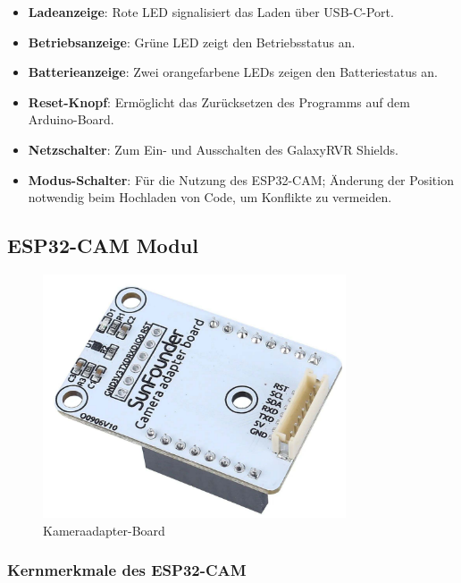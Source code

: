 \documentclass{vorlage-design-main}
\begin{document}
\begin{itemize}
  \begin{itemize}
  
  \item
    \textbf{Ladeanzeige}: Rote LED signalisiert das Laden über
    USB-C-Port.
  \item
    \textbf{Betriebsanzeige}: Grüne LED zeigt den Betriebsstatus an.
  \item
    \textbf{Batterieanzeige}: Zwei orangefarbene LEDs zeigen den
    Batteriestatus an.
  \item
    \textbf{Reset-Knopf}: Ermöglicht das Zurücksetzen des Programms auf
    dem Arduino-Board.
  \item
    \textbf{Netzschalter}: Zum Ein- und Ausschalten des GalaxyRVR
    Shields.
  \item
    \textbf{Modus-Schalter}: Für die Nutzung des ESP32-CAM; Änderung der
    Position notwendig beim Hochladen von Code, um Konflikte zu
    vermeiden.
  \end{itemize}
\end{itemize}

\hypertarget{esp32-cam-modul}{%
\subsection{ESP32-CAM Modul}\label{esp32-cam-modul}}

\begin{figure}
\centering
\includegraphics[width=0.8\textwidth]{images/cam_adapter_board.pdf}
\floatnotes{}
\caption{Kameraadapter-Board}
\end{figure}

\hypertarget{kernmerkmale-des-esp32-cam}{%
\subsubsection{Kernmerkmale des
ESP32-CAM}\label{kernmerkmale-des-esp32-cam}}
\end{document}
